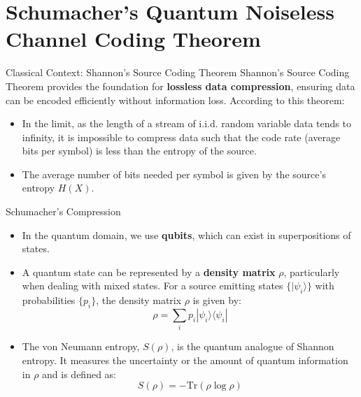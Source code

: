 \section{Schumacher's Quantum Noiseless Channel Coding Theorem}

\begin{frame}{Classical Context: Shannon's Source Coding Theorem}
Shannon's Source Coding Theorem provides the foundation for \textbf{lossless data compression}, ensuring data can be encoded efficiently without information loss. According to this theorem:
\begin{itemize}
    \item In the limit, as the length of a stream of i.i.d. random variable data tends to infinity, it is impossible to compress data such that the code rate (average bits per symbol) is less than the entropy of the source.
    \item The average number of bits needed per symbol is given by the source's entropy \( H(X) \).
\end{itemize}
\end{frame}

\begin{frame}{Schumacher's Compression}

\begin{itemize}
\item In the quantum domain, we use \textbf{qubits}, which can exist in superpositions of states.

\item A quantum state can be represented by a \textbf{density matrix} \( \rho \), particularly when dealing with mixed states. For a source emitting states \( \{ |\psi_i\rangle \} \) with probabilities \( \{ p_i \} \), the density matrix \( \rho \) is given by:
\begin{equation}
    \rho = \sum_i p_i |\psi_i\rangle \langle\psi_i|
\end{equation}

\item The von Neumann entropy, \( S(\rho) \), is the quantum analogue of Shannon entropy. It measures the uncertainty or the amount of quantum information in \( \rho \) and is defined as:
\begin{equation}
    S(\rho) = -\text{Tr}(\rho \log \rho)
\end{equation}
\end{itemize}
\end{frame}

